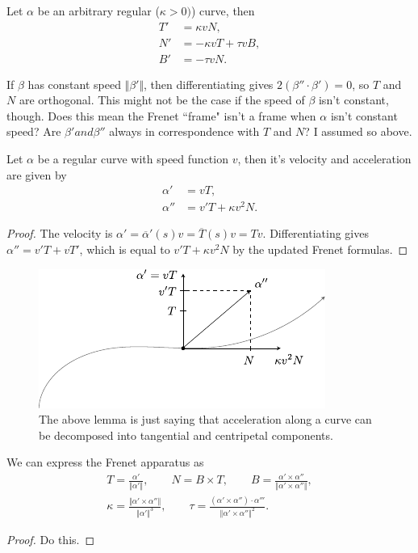 \documentclass[10pt]{report}
\begin{document}
\begin{thrm}[]
	Let $\alpha$ be an arbitrary regular ($\kappa>0)$) curve, then
\begin{align*}
	T' &= \kappa v N, \\
	N' &= -\kappa v T + \tau v B, \\
	B' &= -\tau v N.
\end{align*}
\end{thrm}

If $\beta$ has constant speed $\Vert{\beta'}\Vert$, then differentiating gives $2(\beta''\cdot \beta') = 0$, so $T$ and $N$ are orthogonal. This might not be the case if the speed of $\beta$ isn't constant, though. {\color{red}Does this mean the Frenet ``frame" isn't a frame when $\alpha$ isn't constant speed?} {\color{red}Are $\beta' and \beta''$ always in correspondence with $T$ and $N$? I assumed so above.}

\begin{lem}
	Let $\alpha$ be a regular curve with speed function $v$, then it's velocity and acceleration are given by
	\begin{align*}
		\alpha' &= vT, \\
		\alpha'' &= v'T + \kappa v^2 N.
	\end{align*}
\end{lem}
\begin{proof}
	The velocity is $\alpha' =\overline{\alpha}'(s)v = \overline{T}(s)v = Tv$. Differentiating gives $\alpha''=v'T + vT'$, which is equal to $v'T + \kappa v^2 N$ by the updated Frenet formulas.
\end{proof}

\begin{figure}[H]
	\centering
	\includegraphics[scale=1.5]{fig/frenet2.pdf}
	\caption{The above lemma is just saying that acceleration along a curve can be decomposed into tangential and centripetal components.}
\end{figure}


\begin{thrm}[]
We can express the Frenet apparatus as
\begin{gather*}
	T = \frac{\alpha'}{\Vert{\alpha'}\Vert} ,\quad\quad N = B \times T,\quad\quad B = \frac{\alpha' \times \alpha''}{\Vert{\alpha' \times \alpha''}\Vert} ,\\
	\kappa = \frac{\Vert{\alpha' \times \alpha''}\Vert}{\Vert{\alpha'}\Vert^3} ,\quad\quad \tau = \frac{(\alpha' \times \alpha'')\cdot \alpha'''}{\Vert{\alpha'\times \alpha''}\Vert^2} .
\end{gather*}
\end{thrm}
\begin{proof}
	{\color{red}Do this.}
\end{proof}
\end{document}
